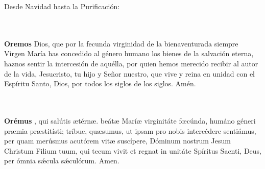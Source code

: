\documentclass[10pt,a4paper,oneside]{book}
\begin{document}
\noindent\small{Desde Navidad hasta la Purificación:}\\
\begin{minipage}[t]{0.475\textwidth}
    \\\\
    \textbf{Oremos}
     Dios, que por la fecunda virginidad de la bienaventurada siempre Virgen María has concedido al género humano los bienes de la salvación eterna, haznos sentir
    la intercesión de aquélla, por quien hemos merecido recibir al autor de la vida, Jesucristo, tu hijo y Señor nuestro, que vive y reina en unidad con el Espíritu Santo, Dios, por 
    todos los siglos de los siglos. Amén.
\end{minipage}
\begin{minipage}[t]{0.475\textwidth}
    \\\\
    \textbf{Orémus} 
    , qui salútis {\ae}térn{\ae}. beát{\ae} Marí{\ae} virginitáte f{\oe}cúnda, humáno géneri pr{\ae}mia pr{\ae}stitísti; tríbue, qu{\ae}sumus, ut ipsam pro nobis 
    intercédere sentiámus, per quam merúsmus acutórem vit{\ae} suscípere, Dóminum nostrum Jesum Christum Filium tuum, qui tecum vivit et regnat in unitáte Spíritus Sacnti, Deus, per ómnia
    s{\'\ae}cula s{\'\ae}culórum. Amen.
\end{minipage}

\bigskip
\end{document}
